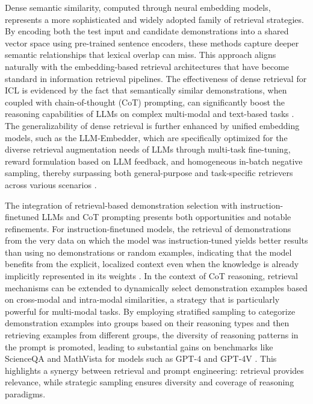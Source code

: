 \documentclass[11pt]{article}
\begin{document}
Dense semantic similarity, computed through neural embedding models, represents a more sophisticated and widely adopted family of retrieval strategies. By encoding both the test input and candidate demonstrations into a shared vector space using pre-trained sentence encoders, these methods capture deeper semantic relationships that lexical overlap can miss. This approach aligns naturally with the embedding-based retrieval architectures that have become standard in information retrieval pipelines. The effectiveness of dense retrieval for ICL is evidenced by the fact that semantically similar demonstrations, when coupled with chain-of-thought (CoT) prompting, can significantly boost the reasoning capabilities of LLMs on complex multi-modal and text-based tasks \cite{ref126}. The generalizability of dense retrieval is further enhanced by unified embedding models, such as the LLM-Embedder, which are specifically optimized for the diverse retrieval augmentation needs of LLMs through multi-task fine-tuning, reward formulation based on LLM feedback, and homogeneous in-batch negative sampling, thereby surpassing both general-purpose and task-specific retrievers across various scenarios \cite{ref127}.

The integration of retrieval-based demonstration selection with instruction-finetuned LLMs and CoT prompting presents both opportunities and notable refinements. For instruction-finetuned models, the retrieval of demonstrations from the very data on which the model was instruction-tuned yields better results than using no demonstrations or random examples, indicating that the model benefits from the explicit, localized context even when the knowledge is already implicitly represented in its weights \cite{ref19}. In the context of CoT reasoning, retrieval mechanisms can be extended to dynamically select demonstration examples based on cross-modal and intra-modal similarities, a strategy that is particularly powerful for multi-modal tasks. By employing stratified sampling to categorize demonstration examples into groups based on their reasoning types and then retrieving examples from different groups, the diversity of reasoning patterns in the prompt is promoted, leading to substantial gains on benchmarks like ScienceQA and MathVista for models such as GPT-4 and GPT-4V \cite{ref126}. This highlights a synergy between retrieval and prompt engineering: retrieval provides relevance, while strategic sampling ensures diversity and coverage of reasoning paradigms.
\end{document}
